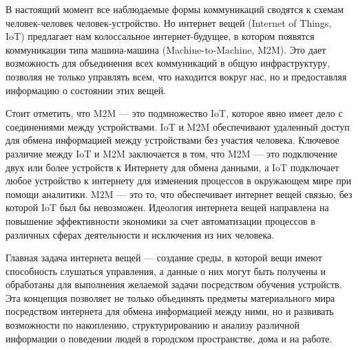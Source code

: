 \Introduction


В настоящий момент все наблюдаемые формы коммуникаций сводятся к схемам человек-человек  человек-устройство. Но интернет вещей (Internet of Things, IoT) предлагает нам колоссальное интернет-будущее, в котором появятся коммуникации типа машина-машина (Machine-to-Machine, M2M). Это дает возможность для объединения всех коммуникаций в общую инфраструктуру, позволяя не только управлять всем, что находится вокруг нас, но и предоставляя информацию о состоянии этих вещей. \cite{Dovgal}

Стоит отметить, что M2M --- это подмножество IoT, которое явно имеет дело с соединениями между устройствами. IoT и M2M обеспечивают удаленный доступ для обмена информацией между устройствами без участия человека. Ключевое различие между IoT и M2M заключается в том, что M2M — это подключение двух или более устройств к Интернету для обмена данными, а IoT подключает любое устройство к интернету для изменения процессов в окружающем мире при помощи аналитики. M2M --- это то, что обеспечивает интернет вещей связью, без которой IoT был бы невозможен. Идеология интернета вещей направлена на повышение эффективности экономики за счет автоматизации процессов в различных сферах деятельности и исключения из них человека.







Главная задача интернета вещей \cite{Markeeva} --- создание среды, в которой вещи имеют способность слушаться управления, а данные о них могут быть получены и обработаны для выполнения желаемой задачи посредством обучения устройств. Эта концепция позволяет не только объединять предметы материального мира посредством интернета для обмена информацией между ними, но и развивать возможности по накоплению, структурированию и анализу различной информации о поведении людей в городском пространстве, дома и на работе.

